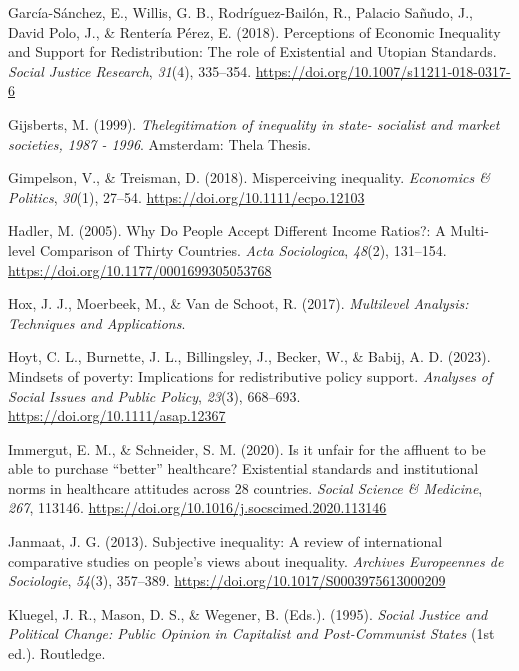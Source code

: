 \documentclass[
  12pt,
]{article}
\newlength{\cslhangindent}
\newenvironment{CSLReferences}[2] %
 {\begin{list}{}{%
  \setlength{\itemindent}{0pt}
  \setlength{\leftmargin}{0pt}
  \setlength{\parsep}{0pt}
  \ifodd #1
   \setlength{\leftmargin}{\cslhangindent}
   \setlength{\itemindent}{-1\cslhangindent}
  \fi
  \setlength{\itemsep}{#2\baselineskip}}}
 {\end{list}}
\begin{document}
\begin{CSLReferences}{1}{0}
García-Sánchez, E., Willis, G. B., Rodríguez-Bailón, R., Palacio Sañudo,
J., David Polo, J., \& Rentería Pérez, E. (2018). Perceptions of
{Economic Inequality} and {Support} for {Redistribution}: {The} role of
{Existential} and {Utopian Standards}. \emph{Social Justice Research},
\emph{31}(4), 335--354. \url{https://doi.org/10.1007/s11211-018-0317-6}

Gijsberts, M. (1999). \emph{{Thelegitimation of inequality in state-
socialist and market societies, 1987 - 1996}}. Amsterdam: Thela Thesis.

Gimpelson, V., \& Treisman, D. (2018). Misperceiving inequality.
\emph{Economics \& Politics}, \emph{30}(1), 27--54.
\url{https://doi.org/10.1111/ecpo.12103}

Hadler, M. (2005). Why {Do People Accept Different Income Ratios}?: {A
Multi-level Comparison} of {Thirty Countries}. \emph{Acta Sociologica},
\emph{48}(2), 131--154. \url{https://doi.org/10.1177/0001699305053768}

Hox, J. J., Moerbeek, M., \& Van de Schoot, R. (2017). \emph{Multilevel
{Analysis}: {Techniques} and {Applications}}.

Hoyt, C. L., Burnette, J. L., Billingsley, J., Becker, W., \& Babij, A.
D. (2023). Mindsets of poverty: {Implications} for redistributive policy
support. \emph{Analyses of Social Issues and Public Policy},
\emph{23}(3), 668--693. \url{https://doi.org/10.1111/asap.12367}

Immergut, E. M., \& Schneider, S. M. (2020). Is it unfair for the
affluent to be able to purchase {``better''} healthcare? {Existential}
standards and institutional norms in healthcare attitudes across 28
countries. \emph{Social Science \& Medicine}, \emph{267}, 113146.
\url{https://doi.org/10.1016/j.socscimed.2020.113146}

Janmaat, J. G. (2013). Subjective inequality: {A} review of
international comparative studies on people's views about inequality.
\emph{Archives Europeennes de Sociologie}, \emph{54}(3), 357--389.
\url{https://doi.org/10.1017/S0003975613000209}

Kluegel, J. R., Mason, D. S., \& Wegener, B. (Eds.). (1995).
\emph{Social {Justice} and {Political Change}: {Public Opinion} in
{Capitalist} and {Post-Communist States}} (1st ed.). Routledge.


\end{CSLReferences}
\end{document}
